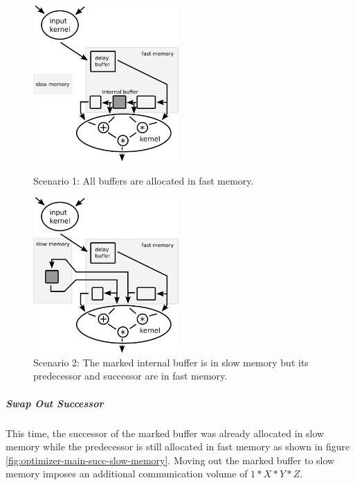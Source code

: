 \begin{figure}[h]
	\begin{minipage}{.5\columnwidth}
		\centering
		\includegraphics[height=16em]{drawings/optimizer-all-fast-memory.png}
		\caption{Scenario 1: All buffers are allocated in fast memory.}
		\label{fig:optimizer-all-fast-memory}
	\end{minipage}
	\begin{minipage}{.5\columnwidth}
		\centering
		\includegraphics[height=16em]{drawings/optimizer-main-slow-memory.png}
		\caption{Scenario 2: The marked internal buffer is in slow memory but its predecessor and successor are in fast memory.}
		\label{fig:optimizer-main-slow-memory}
	\end{minipage}
\end{figure}

\subparagraph{Swap Out Successor}
This time, the successor of the marked buffer was already allocated in slow memory while the predecessor is still allocated in fast memory as shown in figure \ref{fig:optimizer-main-succ-slow-memory}. Moving out the marked buffer to slow memory imposes an additional communication volume of $1*X*Y*Z$. 


